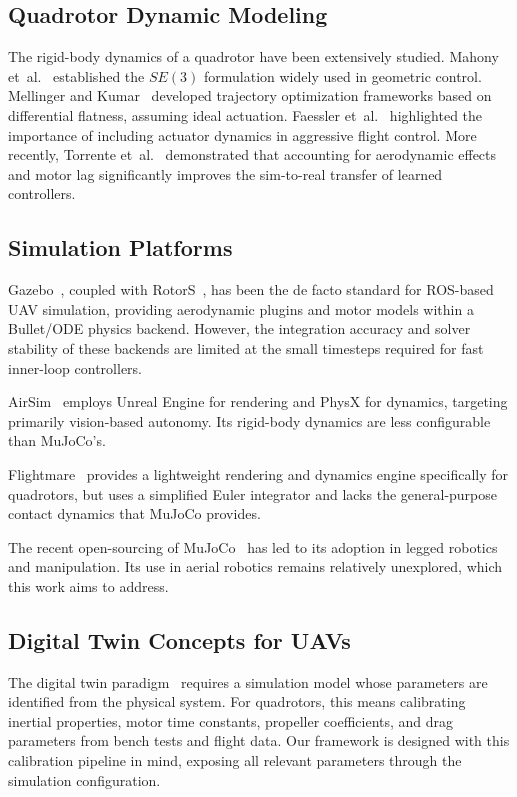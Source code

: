 \documentclass[journal]{IEEEtran}
\begin{document}
\subsection{Quadrotor Dynamic Modeling}

The rigid-body dynamics of a quadrotor have been extensively studied. Mahony et~al.~\cite{mahony2012multirotor} established the $SE(3)$ formulation widely used in geometric control. Mellinger and Kumar~\cite{mellinger2011minimum} developed trajectory optimization frameworks based on differential flatness, assuming ideal actuation. Faessler et~al.~\cite{faessler2017thrust} highlighted the importance of including actuator dynamics in aggressive flight control. More recently, Torrente et~al.~\cite{torrente2021data} demonstrated that accounting for aerodynamic effects and motor lag significantly improves the sim-to-real transfer of learned controllers.

\subsection{Simulation Platforms}

Gazebo~\cite{koenig2004design}, coupled with RotorS~\cite{furrer2016rotors}, has been the de facto standard for ROS-based UAV simulation, providing aerodynamic plugins and motor models within a Bullet/ODE physics backend. However, the integration accuracy and solver stability of these backends are limited at the small timesteps required for fast inner-loop controllers.

AirSim~\cite{shah2018airsim} employs Unreal Engine for rendering and PhysX for dynamics, targeting primarily vision-based autonomy. Its rigid-body dynamics are less configurable than MuJoCo's.

Flightmare~\cite{foehn2020flightmare} provides a lightweight rendering and dynamics engine specifically for quadrotors, but uses a simplified Euler integrator and lacks the general-purpose contact dynamics that MuJoCo provides.

The recent open-sourcing of MuJoCo~\cite{todorov2012mujoco} has led to its adoption in legged robotics and manipulation. Its use in aerial robotics remains relatively unexplored, which this work aims to address.

\subsection{Digital Twin Concepts for UAVs}

The digital twin paradigm~\cite{grieves2017digital} requires a simulation model whose parameters are identified from the physical system. For quadrotors, this means calibrating inertial properties, motor time constants, propeller coefficients, and drag parameters from bench tests and flight data. Our framework is designed with this calibration pipeline in mind, exposing all relevant parameters through the simulation configuration.
\end{document}
